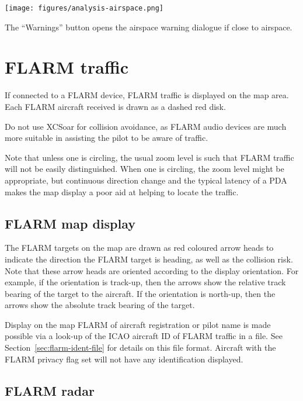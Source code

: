 \begin{center}
\texttt{[image: figures/analysis-airspace.png]}
\end{center}

The ``Warnings'' button opens the airspace warning dialogue if close to
airspace.


\section{FLARM traffic}

If connected to a FLARM device, FLARM traffic is displayed on the map
area.  Each FLARM aircraft received is drawn as a dashed red disk.

\warning Do not use XCSoar for collision avoidance, as
FLARM audio devices are much more suitable in assisting the pilot to be
aware of traffic.

Note that unless one is circling, the usual zoom level is such that
FLARM traffic will not be easily distinguished. When one is circling,
the zoom level might be appropriate, but continuous direction change and
the typical latency of a PDA makes the map display a poor aid at helping
to locate the traffic.


\subsection*{FLARM map display}

The FLARM targets on the map are drawn as red coloured 
arrow heads to indicate the direction the FLARM target is
heading, as well as the collision risk.  Note that these
arrow heads are oriented according to the display orientation.  For example, if 
the orientation is track-up, then the arrows show the relative track bearing of
the target to the aircraft.  If the orientation is north-up, then the arrows show the
absolute track bearing of the target.

Display on the map FLARM of aircraft registration or pilot name is
made possible via a look-up of the ICAO aircraft ID of FLARM traffic
in a file.  See Section~\ref{sec:flarm-ident-file} for details on this
file format.  Aircraft with the FLARM privacy flag set will not have
any identification displayed.


\subsection*{FLARM radar}

